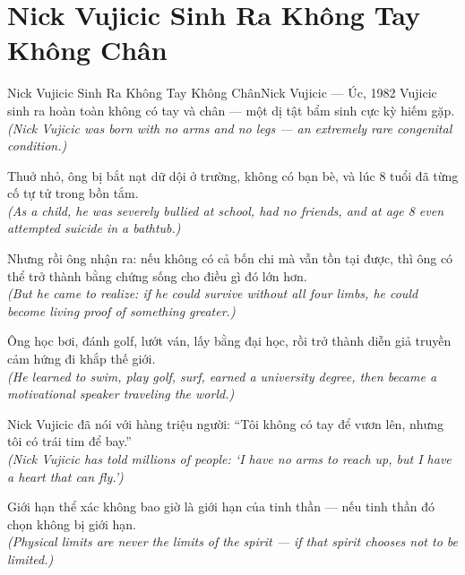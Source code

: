 \section{Nick Vujicic Sinh Ra Không Tay Không Chân}
\begin{truyen}{Nick Vujicic Sinh Ra Không Tay Không Chân}{Nick Vujicic --- Úc, 1982}
 Vujicic sinh ra hoàn toàn không có tay và chân --- một dị tật bẩm sinh cực kỳ hiếm gặp.\\[4pt]
\textit{(Nick Vujicic was born with no arms and no legs --- an extremely rare congenital condition.)}

Thuở nhỏ, ông bị bắt nạt dữ dội ở trường, không có bạn bè, và lúc 8 tuổi đã từng cố tự tử trong bồn tắm.\\[4pt]
\textit{(As a child, he was severely bullied at school, had no friends, and at age 8 even attempted suicide in a bathtub.)}

Nhưng rồi ông nhận ra: nếu không có cả bốn chi mà vẫn tồn tại được, thì ông có thể trở thành bằng chứng sống cho điều gì đó lớn hơn.\\[4pt]
\textit{(But he came to realize: if he could survive without all four limbs, he could become living proof of something greater.)}

Ông học bơi, đánh golf, lướt ván, lấy bằng đại học, rồi trở thành diễn giả truyền cảm hứng đi khắp thế giới.\\[4pt]
\textit{(He learned to swim, play golf, surf, earned a university degree, then became a motivational speaker traveling the world.)}

Nick Vujicic đã nói với hàng triệu người: ``Tôi không có tay để vươn lên, nhưng tôi có trái tim để bay.''\\[4pt]
\textit{(Nick Vujicic has told millions of people: `I have no arms to reach up, but I have a heart that can fly.')}

\end{truyen}
\begin{baihoc}
  Giới hạn thể xác không bao giờ là giới hạn của tinh thần --- nếu tinh thần đó chọn không bị giới hạn.\\[4pt]
  \textit{(Physical limits are never the limits of the spirit --- if that spirit chooses not to be limited.)}
\end{baihoc}

